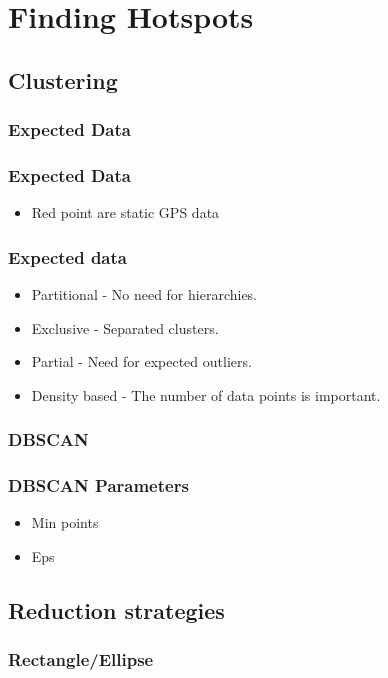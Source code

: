 \section{Finding Hotspots}

\subsection{Clustering}
\subsubsection{Expected Data}
\begin{frame}
\frametitle{Expected Data}
	\begin{itemize}
		\item Red point are static GPS data
	\end{itemize}
	
\end{frame}	
\begin{frame}
\frametitle{Expected data}
	\begin{itemize}
		\item Partitional - No need for hierarchies.
		\item Exclusive - Separated clusters.
		\item Partial - Need for expected outliers.
		\item Density based - The number of data points is important.
	\end{itemize}
	
\end{frame}	
\subsubsection{DBSCAN} %
\begin{frame}
\frametitle{DBSCAN Parameters}
	\begin{itemize}
		\item Min points
		\item Eps
	\end{itemize}
\end{frame}	


\subsection{Reduction strategies}
\subsubsection{Rectangle/Ellipse}
